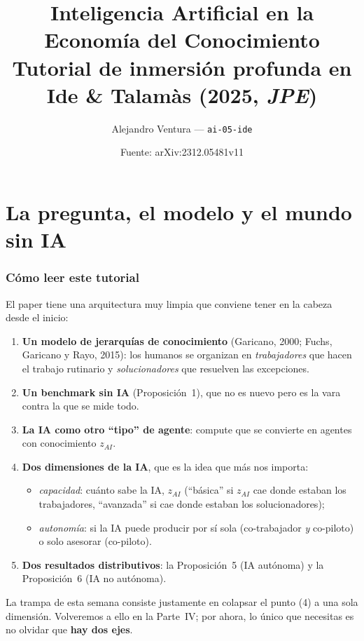 \documentclass[11pt]{article}
\title{Inteligencia Artificial en la Economía del Conocimiento\\[4pt]
\large Tutorial de inmersión profunda en Ide \& Talamàs (2025, \textit{JPE})}
\author{Alejandro Ventura --- \texttt{ai-05-ide}}
\date{Fuente: arXiv:2312.05481v11}
\theoremstyle{definition}
\theoremstyle{remark}
\newcommand{\zai}{z_{AI}}
\begin{document}
\maketitle
\tableofcontents

\part{La pregunta, el modelo y el mundo sin IA}

\section{Cómo leer este tutorial}

El paper tiene una arquitectura muy limpia que conviene tener en la cabeza desde el inicio:

\begin{enumerate}[label=(\arabic*)]
  \item \textbf{Un modelo de jerarquías de conocimiento} (Garicano, 2000; Fuchs, Garicano y Rayo, 2015): los humanos se organizan en \emph{trabajadores} que hacen el trabajo rutinario y \emph{solucionadores} que resuelven las excepciones.
  \item \textbf{Un benchmark sin IA} (Proposición~1), que no es nuevo pero es la vara contra la que se mide todo.
  \item \textbf{La IA como otro ``tipo'' de agente}: compute que se convierte en agentes con conocimiento $\zai$.
  \item \textbf{Dos dimensiones de la IA}, que es la idea que más nos importa:
    \begin{itemize}
      \item \emph{capacidad}: cuánto sabe la IA, $\zai$ (``básica'' si $\zai$ cae donde estaban los trabajadores, ``avanzada'' si cae donde estaban los solucionadores);
      \item \emph{autonomía}: si la IA puede producir por sí sola (co-trabajador \emph{y} co-piloto) o solo asesorar (co-piloto).
    \end{itemize}
  \item \textbf{Dos resultados distributivos}: la Proposición~5 (IA autónoma) y la Proposición~6 (IA no autónoma).
\end{enumerate}

La trampa de esta semana consiste justamente en colapsar el punto (4) a una sola dimensión. Volveremos a ello en la Parte~IV; por ahora, lo único que necesitas es no olvidar que \textbf{hay dos ejes}.
\end{document}
